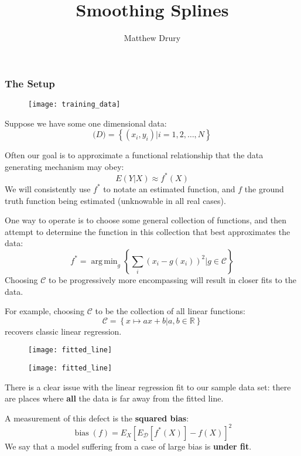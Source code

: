 \documentclass{beamer}
\title{Smoothing Splines}
\author{Matthew Drury}
\DeclareMathOperator*{\argmin}{arg\,min}
\DeclareMathOperator*{\bias}{bias}
\begin{document}
%
\begin{frame}
  \titlepage
\end{frame}
%
\begin{frame}
  \frametitle{The Setup}
  \begin{figure}
    \texttt{[image: training\_data]}
  \end{figure}
  Suppose we have some one dimensional data:
  $$\mathcal(D) = \left\{ (x_i, y_i) | i = 1,2,\ldots,N \right\}$$
\end{frame}
%
\begin{frame}
  Often our goal is to approximate a functional relationship that the data generating mechanism may obey:
  $$E(Y|X) \approx f^*(X)$$
  We will consistently use $f^*$ to notate an estimated function, and $f$ the ground truth function being estimated (unknowable in all real cases).
  
\end{frame}
%
\begin{frame}
  One way to operate is to choose some general collection of functions, and then attempt to determine the function in this collection that best approximates the data:
  $$ f^* = \argmin_{g} \left\{ \sum_i (x_i - g(x_i))^2 | g \in \mathcal{C} \right\} $$
  Choosing $\mathcal{C}$ to be progressively more encompassing will result in closer fits to the data.
\end{frame}
%
\begin{frame}
  For example, choosing $\mathcal{C}$ to be the collection of all linear functions:
  $$ \mathcal{C} = \left\{ x \mapsto ax + b | a,b \in \mathbb{R} \right\} $$
recovers classic linear regression.
  \begin{figure}
    \texttt{[image: fitted\_line]}
  \end{figure}
\end{frame}
%
\begin{frame}
  \begin{figure}
    \texttt{[image: fitted\_line]}
  \end{figure}
  There is a clear issue with the linear regression fit to our sample data set: there are places where \textbf{all} the data is far away from the fitted line.
\end{frame}
%
\begin{frame}
  A measurement of this defect is the \textbf{squared bias}:
  $$ \bias(f) = E_X \left[ E_{\mathcal{D}}[f^*(X)] - f(X) \right] ^2$$
  We say that a model suffering from a case of large bias is \textbf{under fit}.
\end{frame}
%
\end{document}
